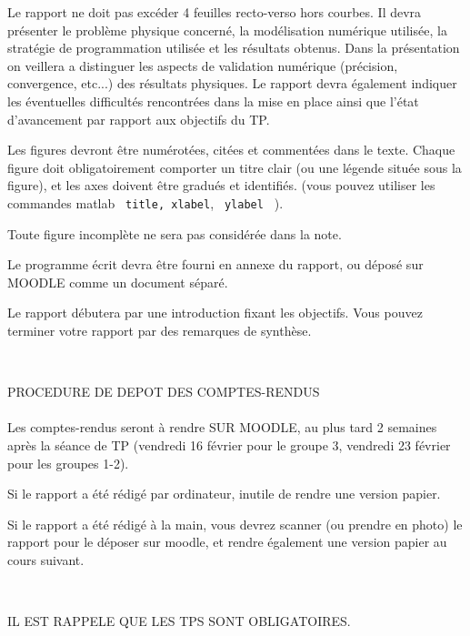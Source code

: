 \documentclass[a4,12pt]{article}
\begin{document}
\begin{enumerate}
\noindent
Le rapport ne doit pas excéder 4 feuilles recto-verso hors courbes. 
Il devra présenter le problème physique concerné, la modélisation numérique utilisée, 
la stratégie de programmation utilisée et les résultats obtenus. Dans la présentation on  veillera a distinguer les aspects de validation numérique (précision, convergence, etc...) des résultats physiques. 
Le rapport devra également indiquer les éventuelles difficultés rencontrées dans la mise en place ainsi que l'état d'avancement par rapport aux objectifs du TP. 
 
\noindent
 Les figures devront \^etre numérotées, citées et commentées dans le texte. Chaque figure doit obligatoirement comporter un titre clair (ou une légende située sous la figure), et les axes doivent être gradués et identifiés. (vous pouvez utiliser les commandes matlab \verb| title, xlabel|,
 \verb| ylabel | ).

Toute figure incomplète ne sera pas considérée dans la note.

{\color{red} Le programme écrit devra être fourni en annexe du rapport, ou déposé sur MOODLE comme un document séparé. 
}


\noindent
Le rapport débutera par une introduction fixant les objectifs. 
Vous pouvez terminer votre rapport par des remarques de synthèse. 

~\\

\begin{center}
{\Large PROCEDURE DE DEPOT DES COMPTES-RENDUS}\\
~\\

Les comptes-rendus seront à rendre SUR MOODLE, au plus tard 2 semaines après 
la séance de TP (vendredi 16 février pour le groupe 3, vendredi 23 février pour les groupes 1-2).

Si le rapport a été rédigé par ordinateur, inutile de rendre une version papier.

Si le rapport a été rédigé à la main, vous devrez scanner (ou prendre en photo) le rapport pour le déposer sur moodle, et rendre également une version papier au cours suivant.







~
~\\


\begin{center}
{\large IL EST RAPPELE QUE LES TPS SONT OBLIGATOIRES.}
\end{center}

\end{center}






\end{enumerate}
\end{document}
